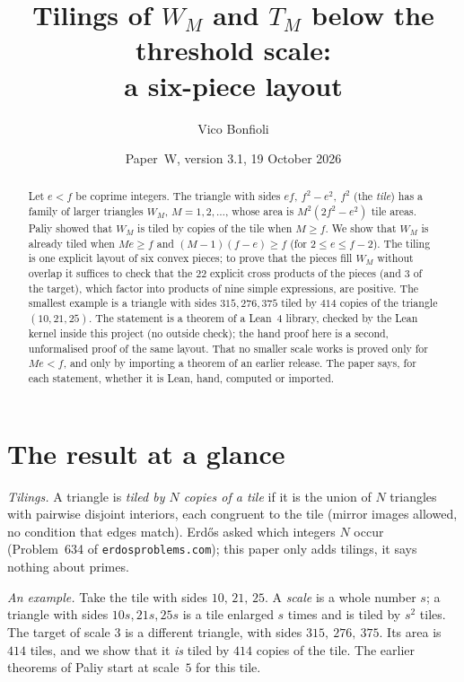 \documentclass[11pt,reqno]{amsart}
\title[Tilings of $W_M$ and $T_M$ below the threshold]{Tilings of $W_M$ and $T_M$ below the threshold scale: \\ a six-piece layout}
\author{Vico Bonfioli}
\date{Paper~W, version 3.1, 19 October 2026}
\theoremstyle{plain}
\theoremstyle{definition}
\begin{document}
\begin{abstract}
Let $e<f$ be coprime integers. The triangle with sides $ef,\ f^2-e^2,\ f^2$ (the \emph{tile}) has a family of larger triangles $W_M$, $M=1,2,\dots$, whose area is $M^2(2f^2-e^2)$ tile areas. Paliy showed that $W_M$ is tiled by copies of the tile when $M\ge f$. We show that $W_M$ is already tiled when $Me\ge f$ and $(M-1)(f-e)\ge f$ (for $2\le e\le f-2$). The tiling is one explicit layout of six convex pieces; to prove that the pieces fill $W_M$ without overlap it suffices to check that the $22$ explicit cross products of the pieces (and $3$ of the target), which factor into products of nine simple expressions, are positive. The smallest example is a triangle with sides $315,276,375$ tiled by $414$ copies of the triangle $(10,21,25)$. The statement is a theorem of a Lean~4 library, checked by the Lean kernel inside this project (no outside check); the hand proof here is a second, unformalised proof of the same layout. That no smaller scale works is proved only for $Me<f$, and only by importing a theorem of an earlier release. The paper says, for each statement, whether it is Lean, hand, computed or imported.
\end{abstract}
\maketitle

\section{The result at a glance}\label{sec:one}
\emph{Tilings.} A triangle is \emph{tiled by $N$ copies of a tile} if it is the union of $N$ triangles with pairwise disjoint interiors, each congruent to the tile (mirror images allowed, no condition that edges match). Erd\H{o}s asked which integers $N$ occur (Problem~634 of \texttt{erdosproblems.com}); this paper only adds tilings, it says nothing about primes.

\emph{An example.} Take the tile with sides $10,\,21,\,25$. A \emph{scale} is a whole number $s$; a triangle with sides $10s,21s,25s$ is a tile enlarged $s$ times and is tiled by $s^2$ tiles. The target of scale $3$ is a different triangle, with sides $315,\ 276,\ 375$. Its area is $414$ tiles, and we show that it \emph{is} tiled by $414$ copies of the tile. The earlier theorems of Paliy start at scale~$5$ for this tile.
\end{document}
